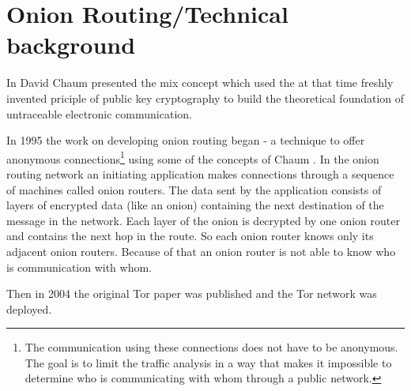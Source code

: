 



\section{Onion Routing/Technical background}

In \cite{chaum1981untraceable} David Chaum presented the mix concept which used the at that time freshly invented priciple of public key cryptography to build the theoretical foundation of untraceable electronic communication.

In 1995 the work on developing onion routing began - a technique to offer anonymous connections\footnote{
	The communication using these connections does not have to be anonymous. The goal is to limit the traffic analysis in a way that makes it impossible to determine who is communicating with whom through a public network.
} using some of the concepts of Chaum \cite{onionroutingproject, goldschlag1996hiding, reed1998anonymous}. In the onion routing network an initiating application makes connections through a sequence of machines called onion routers. The data sent by the application consists of layers of encrypted data (like an onion) containing the next destination of the message in the network. Each layer of the onion is decrypted by one onion router and contains the next hop in the route. So each onion router knows only its adjacent onion routers. Because of that an onion router is not able to know who is communication with whom. 

%
%	
%	
%		
%		
%	
%	
%	
%	
%	
%	
%	
%	
%	
%	
%	
%	
%	
	
Then in 2004 the original Tor paper was published \cite{tor2004original} and the Tor network was deployed.
